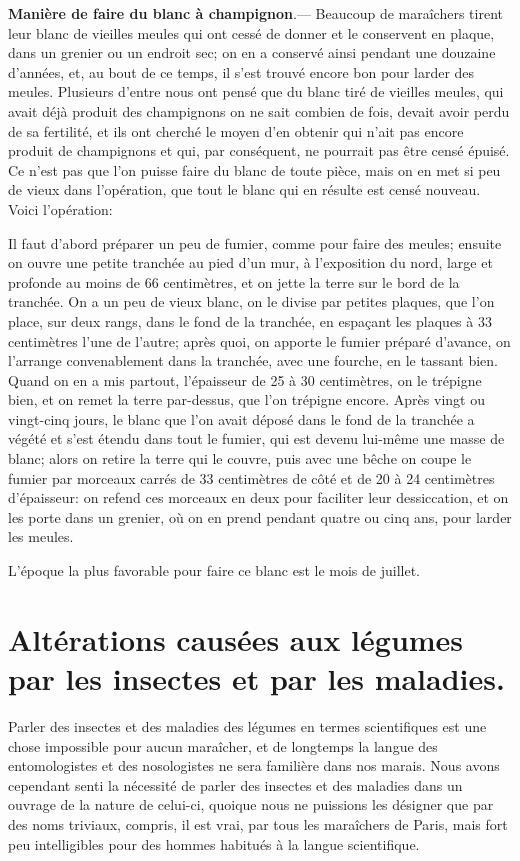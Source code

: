 \documentclass[10pt,a4paper]{book}
\begin{document}
\textbf{Manière de faire du blanc à champignon}.--- Beaucoup de maraîchers tirent leur blanc de vieilles meules qui ont cessé de donner et le conservent en plaque, dans un grenier ou un endroit sec; on en a conservé ainsi pendant une douzaine d'années, et, au bout de ce temps, il s'est trouvé encore bon pour larder des meules. Plusieurs d'entre nous ont pensé que du blanc tiré de vieilles meules, qui avait déjà produit des champignons on ne sait combien de fois, devait avoir perdu de sa fertilité, et ils ont cherché le moyen d'en obtenir qui n'ait pas encore produit de champignons et qui, par conséquent, ne pourrait pas être censé épuisé. Ce n'est pas que l'on puisse faire du blanc de toute pièce, mais on en met si peu de vieux dans l'opération, que tout le blanc qui en résulte est censé nouveau. Voici l'opération:

Il faut d'abord préparer un peu de fumier, comme pour faire des meules; ensuite on ouvre une petite tranchée au pied d'un mur, à l'exposition du nord, large et profonde au moins de 66 centimètres, et on jette la terre sur le bord de la tranchée. On a un peu de vieux blanc, on le divise par petites plaques, que l'on place, sur deux rangs, dans le fond de la tranchée, en espaçant les plaques à 33 centimètres l'une de l'autre; après quoi, on apporte le fumier préparé d'avance, on l'arrange convenablement dans la tranchée, avec une fourche, en le tassant bien. Quand on en a mis partout, l'épaisseur de 25 à 30 centimètres, on le trépigne bien, et on remet la terre par-dessus, que l'on trépigne encore. Après vingt ou vingt-cinq jours, le blanc que l'on avait déposé dans le fond de la tranchée a végété et s'est étendu dans tout le fumier, qui est devenu lui-même une masse de blanc; alors on retire la terre qui le couvre, puis avec une bêche on coupe le fumier par morceaux carrés de 33 centimètres de côté et de 20 à 24 centimètres d'épaisseur: on refend ces morceaux en deux pour faciliter leur dessiccation, et on les porte dans un grenier, où on en prend pendant quatre ou cinq ans, pour larder les meules.

L'époque la plus favorable pour faire ce blanc est le mois de juillet.

\chapter{Altérations causées aux légumes par les insectes et par les maladies.}

Parler des insectes et des maladies des légumes en termes scientifiques est une chose impossible pour aucun maraîcher, et de longtemps la langue des entomologistes et des nosologistes ne sera familière dans nos marais. Nous avons cependant senti la nécessité de parler des insectes et des maladies dans un ouvrage de la nature de celui-ci, quoique nous ne puissions les désigner que par des noms triviaux, compris, il est vrai, par tous les maraîchers de Paris, mais fort peu intelligibles pour des hommes habitués à la langue scientifique.
\end{document}
